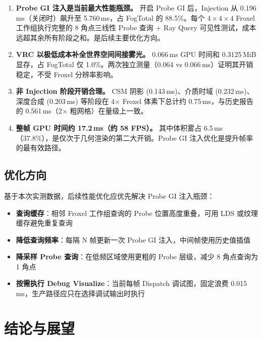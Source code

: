 \documentclass[11pt,a4paper]{article}
\begin{document}
\begin{enumerate}[label=\textbf{\arabic*.}]
    \item \textbf{Probe GI 注入是当前最大性能瓶颈。} 开启 Probe GI 后，Injection 从 0.196\,ms（关闭时）飙升至 5.760\,ms，占 FogTotal 的 88.5\%。每个 $4\times4\times4$ Froxel 工作组执行完整的 8 角点三线性 Probe 查询 + Ray Query 可见性测试，成本远超其余所有阶段之和。是后续主要优化方向。

    \item \textbf{VRC 以极低成本补全世界空间间接雾光。} 0.066\,ms GPU 时间和 0.3125\,MiB 显存，占 FogTotal 仅 1.0\%。两次独立测量（0.064 vs 0.066\,ms）证明其开销稳定，不受 Froxel 分辨率影响。

    \item \textbf{非 Injection 阶段开销合理。} CSM 阴影 (0.143\,ms)、介质时域 (0.232\,ms)、深度合成 (0.203\,ms) 等阶段在 4$\times$ Froxel 体素下总计约 0.75\,ms，与历史报告的 0.561\,ms（2$\times$ 粗网格）在量级上一致。

    \item \textbf{整帧 GPU 时间约 17.2\,ms（约 58 FPS）。} 其中体积雾占 6.5\,ms（37.8\%），是仅次于几何渲染的第二大开销。Probe GI 注入优化是提升帧率的最有效路径。
\end{enumerate}

\subsection{优化方向}

基于本次实测数据，后续性能优化应优先解决 Probe GI 注入瓶颈：

\begin{itemize}
    \item \textbf{查询缓存}：相邻 Froxel 工作组查询的 Probe 位置高度重叠，可用 LDS 或纹理缓存避免重复查询
    \item \textbf{降低查询频率}：每隔 N 帧更新一次 Probe GI 注入，中间帧使用历史值插值
    \item \textbf{降采样 Probe 查询}：在低频区域使用更粗的 Probe 层级，减少 8 角点查询为 1 角点
    \item \textbf{按需执行 Debug Visualize}：当前每帧 Dispatch 调试图，固定浪费 0.015\,ms，生产路径应只在选择调试输出时执行
\end{itemize}

\section{结论与展望}
\end{document}
